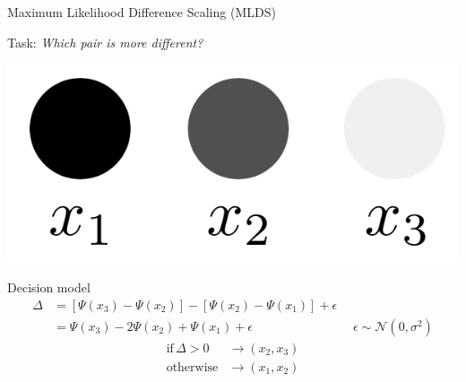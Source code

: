 \documentclass[10pt]{beamer}
\begin{document}
\begin{frame}{Maximum Likelihood Difference Scaling (MLDS)}
\begin{center}
Task: \textit{Which pair is more different?}

\vspace{10pt}
\includegraphics[scale=0.4]{figs/triad.pdf}\\
\begin{block}{Decision model}
\begin{align*}
\Delta & = [\Psi (x_3) - \Psi (x_2)] - [\Psi (x_2) - \Psi (x_1)] + \epsilon\\
& = \Psi (x_3) - 2 \Psi (x_2) + \Psi (x_1) + \epsilon  \quad \quad \quad \quad \quad \quad \quad \quad \epsilon \sim \mathcal{N}(0, \sigma^2)
\end{align*}
\begin{align*}
\text{if} \, \Delta>0 & \rightarrow (x_2, x_3)\\
\text{otherwise} & \rightarrow (x_1, x_2)
\end{align*}
\end{block}
\end{center}
\end{frame}
\end{document}
